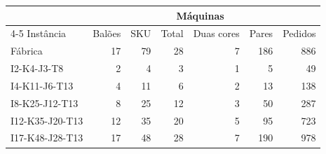 \begin{tabular}{@{}lrrrrrr@{}}
\toprule
 & & & \multicolumn{2}{c}{Máquinas} & & \\
\cmidrule(lr){4-5}
Instância & Balões & SKU & Total & Duas cores & Pares & Pedidos \\
\midrule
Fábrica & 17 & 79 & 28 & 7 & 186 & 886 \\
\midrule
I2-K4-J3-T8 & 2 & 4 & 3 & 1 & 5 & 49 \\
I4-K11-J6-T13 & 4 & 11 & 6 & 2 & 13 & 138 \\
I8-K25-J12-T13 & 8 & 25 & 12 & 3 & 50 & 287 \\
I12-K35-J20-T13 & 12 & 35 & 20 & 5 & 95 & 723 \\
I17-K48-J28-T13 & 17 & 48 & 28 & 7 & 190 & 978 \\
\bottomrule
\end{tabular}
